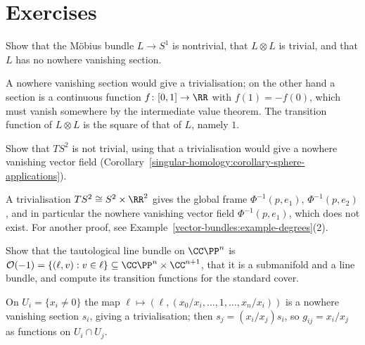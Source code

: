 \section{Exercises}\label{vector-bundles:section-exercises}

\begin{exercise}\label{vector-bundles:exercise-mobius}
Show that the M\"obius bundle $L \to S^1$ is nontrivial, that $L \otimes L$ is trivial, and that $L$ has no nowhere vanishing section.
\end{exercise}

\begin{solution}
A nowhere vanishing section would give a trivialisation; on the other hand a section is a continuous function $f \colon [0, 1] \to \RR$ with $f(1) = -f(0)$, which must vanish somewhere by the intermediate
value theorem. The transition function of $L \otimes L$ is the square of that of $L$, namely $1$.
\end{solution}

\begin{exercise}\label{vector-bundles:exercise-tangent-sphere-nontrivial}
Show that $TS^2$ is not trivial, using that a trivialisation would give a nowhere vanishing vector field (Corollary~\ref{singular-homology:corollary-sphere-applications}).
\end{exercise}

\begin{solution}
A trivialisation $TS^2 \cong S^2 \times \RR^2$ gives the global frame $\Phi^{-1}(p, e_1)$, $\Phi^{-1}(p, e_2)$, and in particular the nowhere vanishing vector field $\Phi^{-1}(p, e_1)$,
which does not exist. For another proof, see Example~\ref{vector-bundles:example-degrees}(2).
\end{solution}

\begin{exercise}\label{vector-bundles:exercise-tautological}
Show that the tautological line bundle on $\CC\PP^n$ is $\mathcal{O}(-1) = \{(\ell, v) : v \in \ell\} \subseteq \CC\PP^n \times \CC^{n+1}$, that it is a submanifold and a line bundle, and compute its transition
functions for the standard cover.
\end{exercise}

\begin{solution}
On $U_i = \{x_i \neq 0\}$ the map $\ell \mapsto (\ell, (x_0/x_i, \ldots, 1, \ldots, x_n/x_i))$ is a nowhere vanishing section $s_i$, giving a trivialisation; then $s_j = (x_i/x_j)s_i$, so
$g_{ij} = x_i/x_j$ as functions on $U_i \cap U_j$.
\end{solution}

